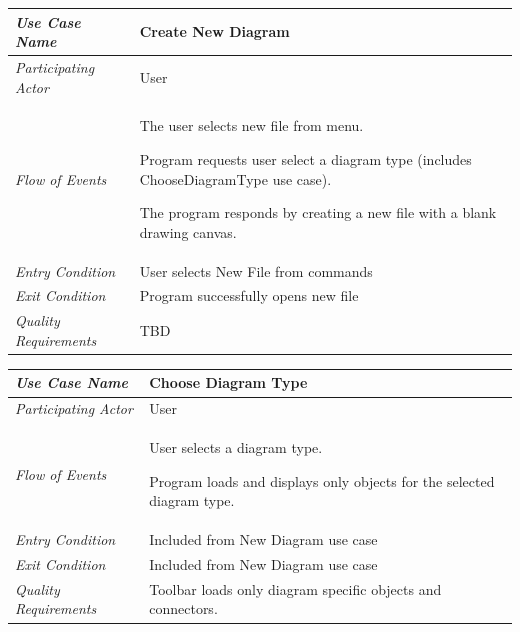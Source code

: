 \documentclass[twoside,letterpaper]{article}
\newenvironment{my_enumerate}{
\begin{enumerate}
  \setlength{\itemsep}{1pt}
  \setlength{\parskip}{0pt}
  \setlength{\parsep}{0pt}}{\end{enumerate}
}
\begin{document}
\begin{flushleft}
\tablehead{}
\begin{tabular}{|m{2.0in} m{5.0in}|}
\hline
{\bfseries\emph{Use Case Name}}
& {\bfseries Create New Diagram }
\\\hline
\emph{Participating Actor}
& User
\\\hline
\emph{Flow of Events}
& \begin{my_enumerate}
\item The user selects new file from menu.
\item Program requests user select a diagram type
(includes ChooseDiagramType use case).
\item The program responds by creating a new file with a blank drawing canvas.
\end{my_enumerate}
\\\hline
\emph{Entry Condition}
& User selects New File from commands
\\\hline
\emph{Exit Condition}
& Program successfully opens new file
\\\hline
\emph{Quality Requirements}
& TBD
\\\hline
\end{tabular}
\end{flushleft}
\bigskip

\begin{flushleft}
\tablehead{}
\begin{tabular}{|m{2.0in} m{5.0in}|}
\hline
{\bfseries\emph{Use Case Name}}
& {\bfseries Choose Diagram Type}
\\\hline
\emph{Participating Actor}
& User 
\\\hline
\emph{Flow of Events}
& \begin{my_enumerate}
\item User selects a diagram type.
\item Program loads and displays only objects for the selected diagram type.
\end{my_enumerate}
\\\hline
\emph{Entry Condition}
& Included from New Diagram use case
\\\hline
\emph{Exit Condition}
& Included from New Diagram use case
\\\hline
\emph{Quality Requirements}
& Toolbar loads only diagram specific objects and connectors.
\\\hline
\end{tabular}
\end{flushleft}
\bigskip
\end{document}
